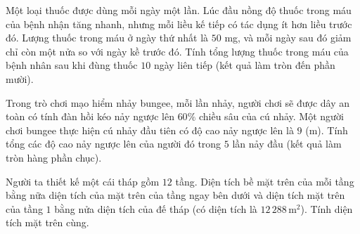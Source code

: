 \begin{ex}%
	Một loại thuốc được dùng mỗi ngày một lần. Lúc đầu nồng độ thuốc trong máu của bệnh nhận tăng  nhanh, nhưng mỗi liều kế tiếp có tác dụng ít hơn liều trước đó. Lượng thuốc trong máu ở ngày thứ nhất là $50$ mg, và mỗi ngày sau đó giảm chỉ còn một nửa so với ngày kề trước đó. Tính tổng lượng thuốc trong máu của bệnh nhân sau khi đùng thuốc $10$ ngày liên tiếp (kết quả làm tròn đến phần mười).
\end{ex}

\begin{ex}%
	Trong trò chơi mạo hiểm nhảy bungee, mỗi lần nhảy, người chơi  sẽ được dây an toàn có tính đàn hồi kéo nảy ngược lên $60 \%$ chiều sâu của cú nhảy. Một người chơi bungee thực hiện cú nhảy đầu tiên có độ cao nảy ngược lên là $9$ (m). Tính tổng các độ cao nảy ngược lên của người đó trong $5$ lần nảy đầu (kết quả làm tròn hàng phần chục).
\end{ex}

\begin{ex}%
	Người ta thiết kế một cái tháp gồm $12$ tầng. Diện tích bề mặt trên của mỗi tầng bằng nữa diện tích của mặt trên của tầng ngay bên dưới và diện tích mặt trên của tầng $1$ bằng nửa diện tích của đế tháp (có diện tích là $12\,288\,\mathrm{m^2}$). Tính diện tích  mặt trên cùng.
\end{ex}

